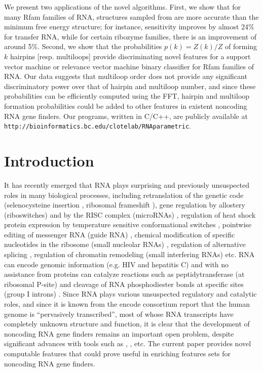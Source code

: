 We present two applications of the novel algorithms. First, we show that
for many Rfam families of RNA, structures sampled from {\rnahairpinml}
are more accurate than the minimum free energy structure; for instance,
sensitivity improves by almost 24\% for transfer RNA, while for
certain ribozyme families, there is an improvement of around 5\%.
Second, we show that the probabilities $p(k) = Z(k)/Z$
of forming $k$ hairpins [resp. multiloops] provide discriminating
novel features for a support vector machine or relevance vector machine
binary classifier for Rfam families of RNA.
Our data suggests that multiloop order does
not provide any significant discriminatory power over that of hairpin
and multiloop number, and since these probabilities
can be efficiently computed using the FFT, hairpin and multiloop formation
probabilities could be added to other features in existent
noncoding RNA gene finders.
Our programs, written in C/C++, are publicly available at
{\tt http://bioinformatics.bc.edu/clotelab/RNAparametric}.

\section{Introduction}

It has recently emerged that RNA plays surprising and previously unsuspected
roles in many biological processes, including retranslation of the genetic code
(selenocysteine insertion \citep{boeckForschhammer}, ribosomal frameshift
\citep{denise:frameshift}), gene regulation by allostery
(riboswitches) \citep{mandalBoeseBarrickWinklerBreaker}
and by the RISC complex (microRNAs) \citep{burgeBartel:miRNAscience},
regulation of heat shock protein expression by
temperature sensitive conformational switches \citep{ROSEswitch,tuckerBreaker:review},
pointwise editing of messenger RNA (guide RNA)
\citep{haeseler:Cryptogenes}, chemical
modification of specific nucleotides in the ribosome (small nucleolar RNAs)
\citep{loweEddy:snoRNAinArchaea},
regulation of alternative splicing \citep{Cheah.n07},
regulation of chromatin remodeling (small interfering RNAs)
\citep{Cam.c09} etc. RNA can encode
genomic information (e.g. HIV and hepatitis C) and with no assistance
from proteins can catalyze reactions such as peptidytransferase
(at ribosomal P-site) \citep{weinger:peptidyltransferase}
and cleavage
of RNA phosphodiester bonds at specific sites (group I introns)
\citep{intron:reviewCech}.
Since RNA plays various unsuspected regulatory and catalytic roles, and
since it is known from the {\sc encode} consortium report
\citep{encodeConsortium} that
the human genome is ``pervasively transcribed'',
most of whose RNA transcripts have completely unknown structure
and function, it is clear that the development of
noncoding RNA gene finders
remains an important open problem, despite significant
advances with tools such as {\rnaz} \citep{Gruber.nar07},
{\foldalign} \citep{Havgaard.nar05}, etc. The current paper
provides novel computable features that could prove useful
in enriching features sets for noncoding RNA gene finders.

